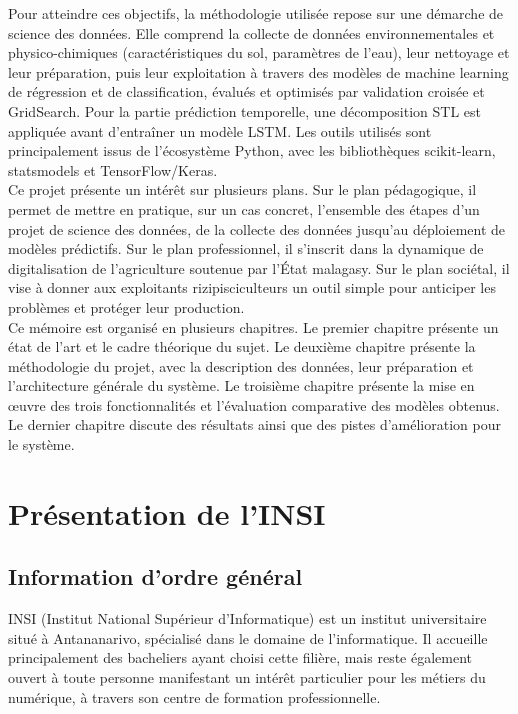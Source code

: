 \documentclass[a4paper,12pt, oneside]{article}
\begin{document}
Pour atteindre ces objectifs, la méthodologie utilisée repose sur une démarche de science des données. Elle comprend la collecte de données environnementales et physico-chimiques (caractéristiques du sol, paramètres de l'eau), leur nettoyage et leur préparation, puis leur exploitation à travers des modèles de machine learning de régression et de classification, évalués et optimisés par validation croisée et GridSearch. Pour la partie prédiction temporelle, une décomposition STL est appliquée avant d'entraîner un modèle LSTM. Les outils utilisés sont principalement issus de l'écosystème Python, avec les bibliothèques scikit-learn, statsmodels et TensorFlow/Keras.\\

Ce projet présente un intérêt sur plusieurs plans. Sur le plan pédagogique, il permet de mettre en pratique, sur un cas concret, l'ensemble des étapes d'un projet de science des données, de la collecte des données jusqu'au déploiement de modèles prédictifs. Sur le plan professionnel, il s'inscrit dans la dynamique de digitalisation de l'agriculture soutenue par l'État malagasy. Sur le plan sociétal, il vise à donner aux exploitants rizipisciculteurs un outil simple pour anticiper les problèmes et protéger leur production.\\

Ce mémoire est organisé en plusieurs chapitres. Le premier chapitre présente un état de l'art et le cadre théorique du sujet. Le deuxième chapitre présente la méthodologie du projet, avec la description des données, leur préparation et l'architecture générale du système. Le troisième chapitre présente la mise en œuvre des trois fonctionnalités et l'évaluation comparative des modèles obtenus. Le dernier chapitre discute des résultats ainsi que des pistes d'amélioration pour le système.
\vspace*{\fill}
\newpage

\section{Présentation de l'INSI}
\subsection{Information d'ordre général}

INSI (Institut National Supérieur d'Informatique) est un institut universitaire situé à Antananarivo, spécialisé dans le domaine de l'informatique. Il accueille principalement des bacheliers ayant choisi cette filière, mais reste également ouvert à toute personne manifestant un intérêt particulier pour les métiers du numérique, à travers son centre de formation professionnelle.
\end{document}
